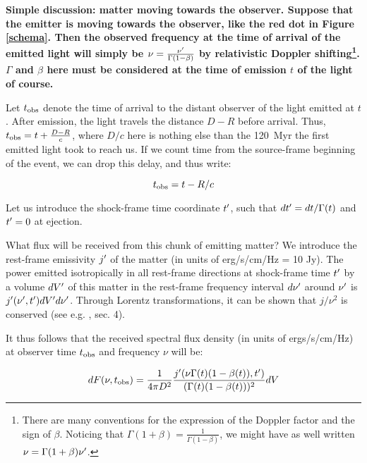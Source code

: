 
\bf{Simple discussion: matter moving towards the observer. }Suppose that the emitter is moving towards the observer, like the red dot in Figure \ref{schema}. Then the observed frequency at the time of arrival of the emitted light will simply be $\nu = \frac{\nu^{\prime}}{\Gamma(1 - \beta)}$ by relativistic Doppler shifting\footnote{There are many conventions for the expression of the Doppler factor and the sign of $\beta$. Noticing that $\Gamma(1 + \beta) = \frac{1}{\Gamma(1 - \beta)}$, we might have as well written $\nu = \Gamma (1 + \beta) \nu^{\prime}$.}. $\Gamma$ and $\beta$ here must be considered at the time of emission $t$ of the light of course.

Let ${t_{\mathrm{obs}}}$ denote the time of arrival to the distant observer of the light emitted at $t$. After emission, the light travels the distance $D - R$ before arrival. Thus, ${t_{\mathrm{obs}}} = t + \frac{D - R}{c}$, where $D/c$ here is nothing else than the 120~Myr the first emitted light took to reach us. If we count time from the source-frame beginning of the event, we can drop this delay, and thus write:

\begin{equation}\label{tobs}
    {t_{\mathrm{obs}}} = t - R/c
\end{equation}

Let us introduce the shock-frame time coordinate $t^{\prime}$, such that $dt^{\prime} = dt/\Gamma(t)$ and $t^{\prime} = 0$ at ejection.

What flux will be received from this chunk of emitting matter? We introduce the rest-frame emissivity $j^{\prime}$ of the matter (in units of erg/s/cm/Hz = 10 Jy). The power emitted isotropically in all rest-frame directions at shock-frame time $t^{\prime}$ by a volume $dV^{\prime}$ of this matter in the rest-frame frequency interval $d\nu^{\prime}$ around $\nu^{\prime}$ is $j^{\prime}(\nu^{\prime}, t^{\prime})dV^{\prime} d\nu^{\prime}$. Through Lorentz transformations, it can be shown that $j/\nu^2$ is conserved (see e.g. \cite{55}, sec. 4).

It thus follows that the received spectral flux density (in units of ergs/s/cm/Hz) at observer time ${t_{\mathrm{obs}}}$ and frequency $\nu$ will be:

$$dF(\nu, {t_{\mathrm{obs}}}) = \frac{1}{4\pi D^2} \frac{j^{\prime}(\nu \Gamma(t)(1 - \beta(t)), t^{\prime})}{(\Gamma(t)(1 - \beta(t)))^2}dV$$

